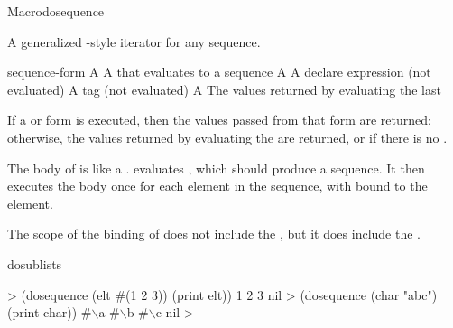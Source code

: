 \documentclass[10pt,twoside,english,pdftex]{article}
\begin{document}

\begin{functiondoc}{Macro}{dosequence}{%
    }
%
  
\fnsyntax

\fnpurpose A generalized -style iterator for any sequence.

\fnpackage {}

\fnmodule {}

\fnargs
\begin{args}{sequence-form}
\arg[var] A 
 A  that evaluates to a sequence
 A 
\arg[declarations] A declare expression (not evaluated)
\arg[tag] A  tag (not evaluated)
\arg[form] A 
\arg[results] The values returned by evaluating the last 
\end{args}

\fnreturns If a  or  form is executed,
then the values passed from that form are returned; otherwise, the values
returned by evaluating the  are returned, or \nil{}
if there is no .

\fndescription The body of  is like a
.   evaluates
, which should produce a sequence. It then executes
the body once for each element in the sequence, with  bound to the
element.

The scope of the binding of  does not include the
, but it does include the .

\begin{alsos}{dosublists}
\also[dosublists]
\end{alsos}

\fnexamples
%
\W\supp
\begin{example}
  > (dosequence (elt #(1 2 3)) (print elt))
  1 
  2 
  3 
  nil\goodpagebreak
  > (dosequence (char "abc") (print char))
  #\(\backslash\)a 
  #\(\backslash\)b 
  #\(\backslash\)c
  nil
  >
\end{example}

\end{functiondoc}
\end{document}
